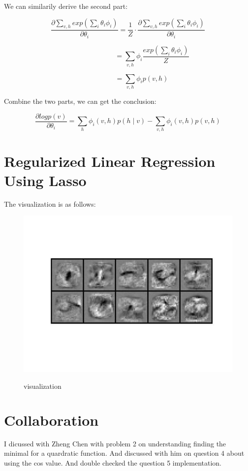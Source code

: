 \documentclass{article} %
\begin{document}
We can similarily derive the second part:

\begin{equation}
\frac{\partial \sum_{v,h} exp(\sum_i \theta_i \phi_i)}{\partial \theta_i}
= \frac{1}{Z} \cdot \frac{\partial \sum_{v,h} exp(\sum_i \theta_i \phi_i)}
{\partial \theta_i}
\end{equation}

\begin{equation}
\qquad \qquad \qquad \quad = 
\sum_{v,h} \phi_i \frac{exp(\sum_i \theta_i \phi_i)}{Z} 
\end{equation}

\begin{equation}
\qquad \qquad = 
\sum_{v,h} \phi_i p(v,h)
\end{equation}

Combine the two parts, we can get the conclusion:

\begin{equation}
\frac{\partial log p(v)}{\partial \theta_i} = \sum_h \phi_i (v,h) p(h \mid v)
- \sum_{v,h} \phi_i (v,h) p(v,h)
\end{equation}



\section{Regularized Linear Regression Using Lasso}

The visualization is as follows:

\begin{figure}[h]
\begin{center}
\label{fig:nn}
\includegraphics[width=12cm]{pic/result.jpg}
\caption{visualization}
\end{center}
\end{figure}



\section{Collaboration}
I dicussed with Zheng Chen with problem 2 on understanding finding the minimal
for a quardratic function. And discussed with him on question 4 about using the
cos value. And double checked the question 5 implementation.
\end{document}
